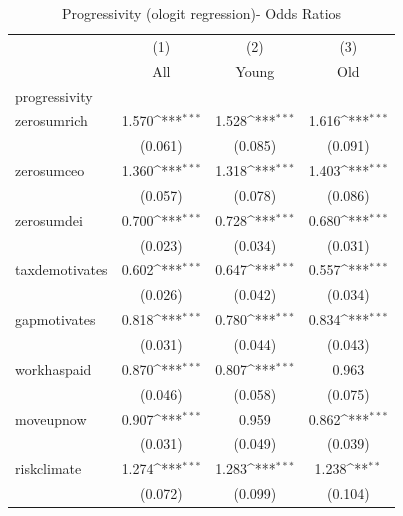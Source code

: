 \begin{table}[htbp]\centering
\def\sym#1{\ifmmode^{#1}\else\(^{#1}\)\fi}
\caption{Progressivity (ologit regression)- Odds Ratios}
\begin{tabular}{l*{3}{c}}
\toprule
            &\multicolumn{1}{c}{(1)}&\multicolumn{1}{c}{(2)}&\multicolumn{1}{c}{(3)}\\
            &\multicolumn{1}{c}{All}&\multicolumn{1}{c}{Young}&\multicolumn{1}{c}{Old}\\
\midrule
progressivity&                     &                     &                     \\
zerosumrich &       1.570\sym{***}&       1.528\sym{***}&       1.616\sym{***}\\
            &     (0.061)         &     (0.085)         &     (0.091)         \\
\addlinespace
zerosumceo  &       1.360\sym{***}&       1.318\sym{***}&       1.403\sym{***}\\
            &     (0.057)         &     (0.078)         &     (0.086)         \\
\addlinespace
zerosumdei  &       0.700\sym{***}&       0.728\sym{***}&       0.680\sym{***}\\
            &     (0.023)         &     (0.034)         &     (0.031)         \\
\addlinespace
taxdemotivates&       0.602\sym{***}&       0.647\sym{***}&       0.557\sym{***}\\
            &     (0.026)         &     (0.042)         &     (0.034)         \\
\addlinespace
gapmotivates&       0.818\sym{***}&       0.780\sym{***}&       0.834\sym{***}\\
            &     (0.031)         &     (0.044)         &     (0.043)         \\
\addlinespace
workhaspaid &       0.870\sym{***}&       0.807\sym{***}&       0.963         \\
            &     (0.046)         &     (0.058)         &     (0.075)         \\
\addlinespace
moveupnow   &       0.907\sym{***}&       0.959         &       0.862\sym{***}\\
            &     (0.031)         &     (0.049)         &     (0.039)         \\
\addlinespace
riskclimate &       1.274\sym{***}&       1.283\sym{***}&       1.238\sym{**} \\
            &     (0.072)         &     (0.099)         &     (0.104)         \\

\end{tabular}
\end{table}
